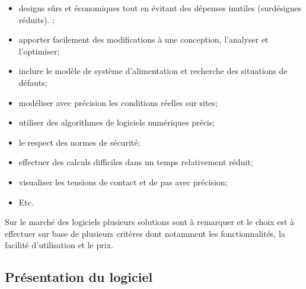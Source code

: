 \begin{itemize}
\item  designs sûrs et économiques tout en évitant des dépenses inutiles (surdésignes réduits).
;
\item apporter facilement des modifications à une conception, l'analyser et l'optimiser;
\item inclure le modèle de système d'alimentation et recherche des situations de défauts;
\item modéliser avec précision les conditions réelles sur sites;
\item utiliser des algorithmes de logiciels numériques précis;
\item le respect des normes de sécurité;
\item effectuer des calculs difficiles dans un temps relativement réduit;
\item visualiser les tensions de contact et de pas avec précision;
\item Etc.
\end{itemize}
Sur le marché des logiciels plusieurs solutions sont à remarquer et le choix est à effectuer sur base de plusieurs critères dont notamment les fonctionnalités, la facilité d'utilisation et le prix.

		\subsection{Présentation du logiciel}
		